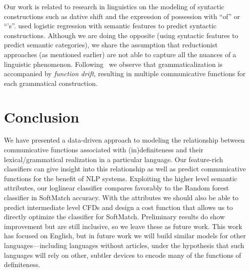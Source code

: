 \documentclass[11pt,letterpaper]{article}
\newcommand{\ensuretext}[1]{#1}
\newcommand{\nssmarker}{\ensuretext{\textcolor{magenta}{\ensuremath{^{\textsc{NS}}_{\textsc{S}}}}}}
\newcommand{\abmarker}{\ensuretext{\textcolor{red}{\ensuremath{^{\textsc{A}}_{\textsc{B}}}}}}
\newcommand{\arkcomment}[3]{\ensuretext{\textcolor{#3}{[#1 #2]}}}
\newcommand{\nss}[1]{\arkcomment{\nssmarker}{#1}{magenta}}
\newcommand{\ab}[1]{\arkcomment{\abmarker}{#1}{red}}
\begin{document}


Our work is related to research in linguistics on the modeling of syntactic constructions 
such as dative shift and the expression of possession with ``of'' or ``'s''.  
\citet{bresnan10} used logistic regression with semantic features to predict syntactic constructions.   
Although we are doing the opposite (using syntactic features to predict semantic categories), 
we share the assumption that reductionist approaches (as mentioned earlier) are not able to capture all the nuances of a linguistic phenomenon. 
Following~\citet{hopper-03} we observe that grammaticalization is accompanied by {\em function drift}, 
resulting in multiple communicative functions for each grammatical construction. 



\section{Conclusion}\label{sec:conclusion}

We have presented a data-driven approach to modeling the relationship between 
communicative functions associated with (in)definiteness and their lexical\slash grammatical realization in a particular language.
Our feature-rich classifiers can give insight into this relationship
as well as predict communicative functions for the benefit of NLP systems.
Exploiting the higher level semantic attributes, our loglinear classifier compares favorably to the Random forest classifier in SoftMatch accuracy. With the attributes we should also be able to predict intermediate level CFDs and design a cost function that allows us to directly optimize the classifier for SoftMatch. Preliminary results do show improvement but are still inclusive, so we leave these as future work.
This work has focused on English, but in future work we will build similar models for other languages---including 
languages without articles, under the hypothesis that such languages will rely on other, subtler devices to encode
many of the functions of definiteness.





\setlength{\bibsep}{10pt}
{\fontsize{10}{12.25}\selectfont
}
\end{document}
